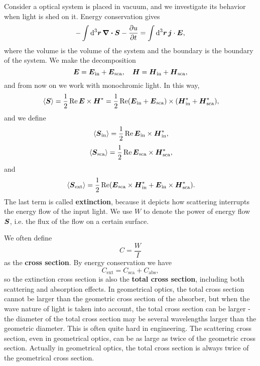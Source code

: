 \documentclass[hyperref, a4paper]{article}
\newcommand*{\concept}[1]{{\textbf{#1}}}
\begin{document}
Consider a optical system is placed in vacuum, and we investigate its behavior when light is shed on it.
Energy conservation gives 
\begin{equation}
    - \int \dd[3]{\vb*{r}} \div{\vb*{S}} - \pdv{u}{t} = \int \dd[3]{\vb*{r}} \vb*{j} \cdot \vb*{E},
\end{equation}
where the volume is the volume of the system and the boundary is the boundary of the system.
We make the decomposition 
\begin{equation}
    \vb*{E} = \vb*{E}_\text{in} + \vb*{E}_\text{sca}, \quad \vb*{H} = \vb*{H}_\text{in} + \vb*{H}_\text{sca},
\end{equation}
and from now on we work with monochromic light. In this way, 
\[
    \expval*{\vb*{S}} = \frac{1}{2} \Re \vb*{E} \times \vb*{H}^* 
    = \frac{1}{2} \Re (\vb*{E}_\text{in} + \vb*{E}_\text{sca}) \times (\vb*{H}_\text{in}^* + \vb*{H}_\text{sca}^*),
\]
and we define 
\begin{equation}
    \expval*{\vb*{S}_\text{in}} = \frac{1}{2} \Re \vb*{E}_\text{in} \times \vb*{H}_\text{in}^*,
\end{equation}
\begin{equation}
    \expval*{\vb*{S}_\text{sca}} = \frac{1}{2} \Re \vb*{E}_\text{sca} \times \vb*{H}_\text{sca}^*,
\end{equation}
and 
\begin{equation}
    \expval*{\vb*{S}_\text{ext}} = \frac{1}{2} \Re (\vb*{E}_\text{sca} \times \vb*{H}_\text{in}^* + \vb*{E}_\text{in} \times \vb*{H}_\text{sca}^*).
\end{equation}
The last term is called \concept{extinction}, because it depicts how scattering interrupts the energy flow of 
the input light. We use $W$ to denote the power of energy flow $\vb*{S}$, i.e. the flux of the flow on a certain 
surface.

We often define 
\begin{equation}
    C = \frac{W}{I}
\end{equation}
as the \concept{cross section}. By energy conservation we have 
\begin{equation}
    C_\text{ext} = C_\text{sca} + C_\text{abs},
\end{equation}
so the extinction cross section is also the \concept{total cross section}, including both scattering 
and absorption effects. In geometrical optics, the total cross section cannot be larger than the geometric
cross section of the absorber, but when the wave nature of light is taken into account, the total cross 
section can be larger - the diameter of the total cross section may be several wavelengths larger than the 
geometric diameter. This is often quite hard in engineering. The scattering cross section, even in geometrical
optics, can be as large as twice of the geometric cross section. Actually in geometrical optics, 
the total cross section is always twice of the geometrical cross section. %
\end{document}
